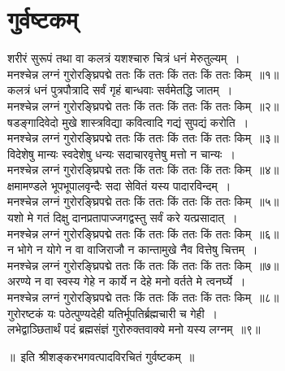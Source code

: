 \documentclass[twoside,12pt,notitlepage]{book}
\begin{document}
\section[गुर्वष्टकम्]{ गुर्वष्टकम्}
\noindent शरीरं सुरूपं तथा वा कलत्रं यशश्चारु चित्रं धनं मेरुतुल्यम्~।\\[-6pt]
मनश्चेन्न लग्नं गुरोरङ्घ्रिपद्मे ततः किं ततः किं ततः किं ततः किम्~॥१॥\\
कलत्रं धनं पुत्रपौत्रादि सर्वं गृहं बान्धवाः सर्वमेतद्धि जातम्~।\\[-6pt]
मनश्चेन्न लग्नं गुरोरङ्घ्रिपद्मे ततः किं ततः किं ततः किं ततः किम्~॥२॥\\
षडङ्गादिवेदो मुखे शास्त्रविद्या कवित्वादि गद्यं सुपद्यं करोति~।\\[-6pt]
मनश्चेन्न लग्नं गुरोरङ्घ्रिपद्मे ततः किं ततः किं ततः किं ततः किम्~॥३॥\\
विदेशेषु मान्यः स्वदेशेषु धन्यः सदाचारवृत्तेषु मत्तो न चान्यः~।\\[-6pt]
मनश्चेन्न लग्नं गुरोरङ्घ्रिपद्मे ततः किं ततः किं ततः किं ततः किम्~॥४॥\\
क्षमामण्डले भूपभूपालवृन्दैः सदा सेवितं यस्य पादारविन्दम्~।\\[-6pt]
मनश्चेन्न लग्नं गुरोरङ्घ्रिपद्मे ततः किं ततः किं ततः किं ततः किम्~॥५॥\\
यशो मे गतं दिक्षु दानप्रतापाज्जगद्वस्तु सर्वं करे यत्प्रसादात्~।\\[-6pt]
मनश्चेन्न लग्नं गुरोरङ्घ्रिपद्मे ततः किं ततः किं ततः किं ततः किम्~॥६॥\\
न भोगे न योगे न वा वाजिराजौ न कान्तामुखे नैव वित्तेषु चित्तम्~।\\[-6pt]
मनश्चेन्न लग्नं गुरोरङ्घ्रिपद्मे ततः किं ततः किं ततः किं ततः किम्~॥७॥\\
अरण्ये न वा स्वस्य गेहे न कार्ये न देहे मनो वर्तते मे त्वनर्घ्ये~।\\[-6pt]
मनश्चेन्न लग्नं गुरोरङ्घ्रिपद्मे ततः किं ततः किं ततः किं ततः किम्~॥८॥\\
गुरोरष्टकं यः पठेत्पुण्यदेही यतिर्भूपतिर्ब्रह्मचारी च गेही~।\\[-6pt]
लभेद्वाञ्छितार्थं पदं ब्रह्मसंज्ञं गुरोरुक्तवाक्ये मनो यस्य लग्नम्~॥९॥

\hfil {\small ॥~इति श्रीशङ्करभगवत्पादविरचितं गुर्वष्टकम्~॥}

\thispagestyle{empty}

\clearpage
\end{document}
